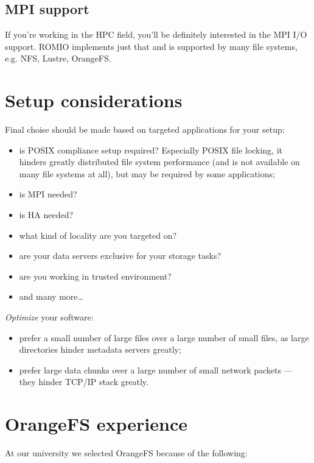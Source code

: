 \documentclass[10pt, a5paper]{article}
\begin{document}
\subsection*{MPI support}

If you're working in the HPC\cite{bib9} field, you'll be definitely interested in the MPI\cite{bib13} I/O support. ROMIO\cite{bib14} implements just that and is supported by many file systems, e.g. NFS\cite{bib3}, Lustre\cite{bib10}, OrangeFS\cite{bib11}.

\section*{Setup considerations}

Final choise should be made based on targeted applications for your setup:

\begin{itemize}
  \item is POSIX compliance setup required? Especially POSIX file locking, it hinders greatly distributed file system performance (and is not available on many file systems at all), but may be required by some applications;
  \item is MPI\cite{bib13} needed?
  \item is HA needed?
  \item what kind of locality are you targeted on?
  \item are your data servers exclusive for your storage tasks?
  \item are you working in trusted environment?
  \item and many more\ldots{}
\end{itemize}

\emph{Optimize} your software:

\begin{itemize}
  \item prefer a small number of large files over a large number of small files, as large directories hinder metadata servers greatly;
  \item prefer large data chunks over a large number of small network packets — they hinder TCP/IP stack greatly.
\end{itemize}

\section*{OrangeFS experience}

At our university we selected OrangeFS because of the following:
\end{document}
